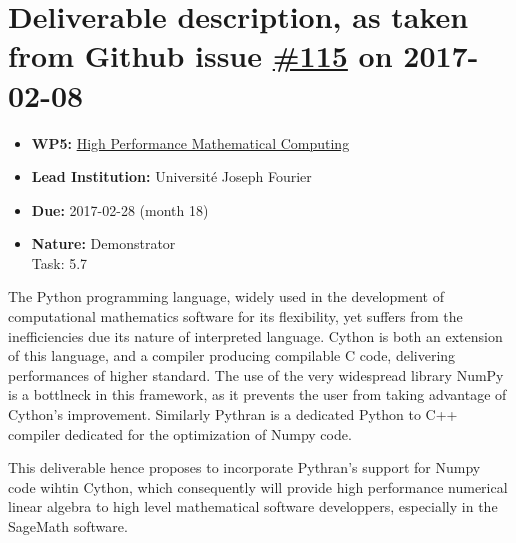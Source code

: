 \section*{\texorpdfstring{Deliverable description, as taken from Github
issue
\href{https://github.com/OpenDreamKit/OpenDreamKit/issues/115}{\#115} on
2017-02-08}{Deliverable description, as taken from Github issue \#115 on 2017-02-08}}\label{deliverable-description-as-taken-from-github-issue-115-on-2017-02-08}

\begin{itemize}
\tightlist
\item
  \textbf{WP5:}
  \href{https://github.com/OpenDreamKit/OpenDreamKit/tree/master/WP5}{High
  Performance Mathematical Computing}
\item
  \textbf{Lead Institution:} Université Joseph Fourier
\item
  \textbf{Due:} 2017-02-28 (month 18)
\item
  \textbf{Nature:} Demonstrator\\
  Task: 5.7
\end{itemize}


The Python programming language, widely used in the development of
computational mathematics software for its flexibility, yet suffers from the
inefficiencies due its nature of interpreted language. Cython is both an extension of
this language, and a compiler producing compilable C code, delivering
performances of higher standard.
The use of the very widespread library NumPy is a bottlneck in this framework,
as it prevents the user from taking advantage of Cython's improvement.
Similarly Pythran is a dedicated Python to C++ compiler dedicated for the
optimization of Numpy code.

This deliverable hence proposes to incorporate Pythran's support for Numpy code
wihtin Cython, which consequently will provide high performance numerical linear
algebra to high level mathematical software developpers, especially in the
SageMath software.
